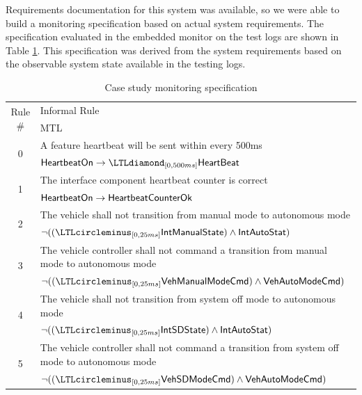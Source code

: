 Requirements documentation for this system was available, so we were able to build a monitoring specification based on actual system requirements.
The specification evaluated in the embedded monitor on the test logs are shown in Table \ref{tab:monspec}. This specification was derived from the system requirements based on the observable system state available in the testing logs.



\begin{table}[htbp]
\centering
\footnotesize
\begin{tabular}{|c|p{4.5in}|}
\hline \multirow{2}{*}{Rule \#} & Informal Rule \\ & MTL \\
\hline \multirow{2}{*}{0} & A feature heartbeat will be sent within every 500ms \\
& $\pred{HeartbeatOn} \rightarrow \LTLdiamond_{[0,500ms]} \pred{HeartBeat}$ \\
\hline \multirow{2}{*}{1} & The interface component heartbeat counter is correct \\
& $\mathsf{HeartbeatOn} \rightarrow \mathsf{HeartbeatCounterOk}$ \\
\hline \multirow{2}{*}{2} & The vehicle shall not transition from manual mode to autonomous mode \\
&  $\neg ((\LTLcircleminus_{[0,25ms]} \pred{IntManualState}) \wedge \pred{IntAutoStat})$\\
\hline \multirow{2}{*}{3} & The vehicle controller shall not command a transition from manual mode to autonomous mode \\
& $\neg ((\LTLcircleminus_{[0,25ms]} \pred{VehManualModeCmd}) \wedge \pred{VehAutoModeCmd})$\\
\hline \multirow{2}{*}{4} & The vehicle shall not transition from system off mode to autonomous mode \\
&  $\neg ((\LTLcircleminus_{[0,25ms]} \pred{IntSDState}) \wedge \pred{IntAutoStat})$\\
\hline \multirow{2}{*}{5} & The vehicle controller shall not command a transition from system off mode to autonomous mode \\
& $\neg ((\LTLcircleminus_{[0,25ms]} \pred{VehSDModeCmd}) \wedge \pred{VehAutoModeCmd})$\\
\hline
\end{tabular}
\caption{Case study monitoring specification \label{tab:monspec}}
\end{table}

